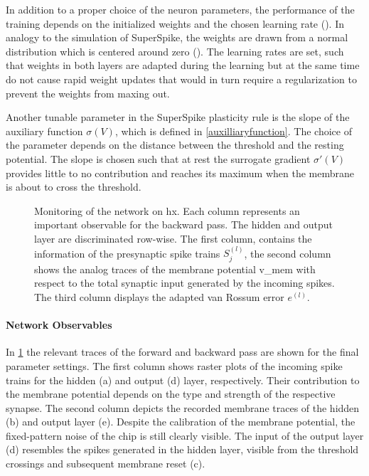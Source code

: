 In addition to a proper choice of the neuron parameters, the performance of the training depends on the initialized weights and the chosen learning rate (\citealp{Goodfellow-et-al-2016}). In analogy to the simulation of SuperSpike, the weights are drawn from a normal distribution which is centered around zero (\citealp{zenke2018superspike}). The learning rates are set, such that weights in both layers are adapted during the learning but at the same time do not cause rapid weight updates that would in turn require a regularization to prevent the weights from maxing out.

Another tunable parameter in the SuperSpike plasticity rule is the slope of the auxiliary function $\sigma(V)$, which is defined in \cref{auxilliaryfunction}. The choice of the parameter depends on the distance between the threshold and the resting potential. The slope is chosen such that at rest the surrogate gradient $\sigma'(V)$ provides little to no contribution and reaches its maximum when the membrane is about to cross the threshold.




\begin{figure}[htb!]
	\centering
	
	\caption[Monitoring of the network on \gls{hx}.]{Monitoring of the network on \gls{hx}. Each column represents an important observable for the backward pass. The hidden and output layer are discriminated row-wise. The first column, contains the information of the presynaptic spike trains $S_j^{(l)}$, the second column shows the analog traces of the membrane potential \gls{v_mem} with respect to the total synaptic input generated by the incoming spikes. The third column displays the adapted van Rossum error $e^{(l)}$.}
	\label{debugplot}
\end{figure}


\paragraph{Network Observables}
In \cref{debugplot} the relevant traces of the forward and backward pass are shown for the final parameter settings. The first column shows raster plots of the incoming spike trains for the hidden (a) and output (d) layer, respectively. Their contribution to the membrane potential depends on the type and strength of the respective synapse. The second column depicts the recorded membrane traces of the hidden (b) and output layer (e). Despite the calibration of the membrane potential, the fixed-pattern noise of the chip is still clearly visible. The input of the output layer (d) resembles the spikes generated in the hidden layer, visible from the threshold crossings and subsequent membrane reset (c).

